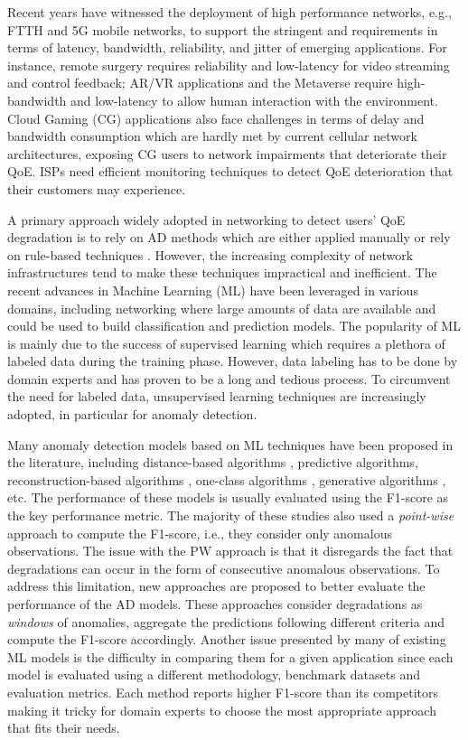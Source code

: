 Recent years have witnessed the deployment of high performance networks, e.g., FTTH and 5G mobile networks, to support the stringent and requirements in terms of latency, bandwidth, reliability, and jitter of emerging applications. For instance, remote surgery requires reliability and low-latency for video streaming and control feedback; AR/VR applications and the Metaverse require high-bandwidth and low-latency to allow human interaction with the environment. Cloud Gaming (CG) applications also face challenges in terms of delay and bandwidth consumption which are hardly met by current cellular network architectures, exposing CG users to network impairments that deteriorate their \ac{QoE}. \ac{ISP}s need efficient monitoring techniques to detect QoE deterioration that their customers may experience.

A primary approach widely adopted in networking to detect users' QoE degradation is to rely on \ac{AD} methods which are either applied manually or rely on rule-based techniques \cite{cannady1998artificial}. 
However, the increasing complexity of network infrastructures tend to make these techniques impractical and inefficient. The recent advances in Machine Learning (ML) have been leveraged in various domains, including networking where large amounts of data are available and could be used to build classification and prediction models. The popularity of ML is mainly due to the success of supervised learning which requires a plethora of labeled data during the training phase. However, data labeling has to be done by domain experts and has proven to be a long and tedious process. To circumvent the need for labeled data, unsupervised learning techniques are increasingly adopted, in particular for anomaly detection.

Many anomaly detection models based on ML techniques have been proposed in the literature, including distance-based algorithms \cite{liu2008isolation,Ramaswamy2000EfficientAF}, predictive algorithms, reconstruction-based algorithms \cite{zong2018deep, audibert2020usad}, one-class algorithms \cite{scholkopf1999support, pmlr-v80-ruff18a}, generative algorithms \cite{GoodfellowIan2020GenerativeAN}, etc. The performance of these models is usually evaluated using the F1-score as the key performance metric. The majority of these studies also used a \textit{point-wise} approach to compute the F1-score, i.e., they consider only anomalous observations. The issue with the \ac{PW} approach is that it disregards the fact that degradations can occur in the form of consecutive anomalous observations. To address this limitation, new approaches \cite{xu2018unsupervised,Lavin2015EvaluatingRA, hundman2018detecting} are proposed to better evaluate the performance of the AD models. These approaches consider degradations as \textit{windows} of anomalies, aggregate the predictions following different criteria and compute the F1-score accordingly. Another issue presented by many of existing ML models is the difficulty in comparing them for a given application since each model is evaluated using a different methodology, benchmark datasets and evaluation metrics. Each method reports higher F1-score than its competitors making it tricky for domain experts to choose the most appropriate approach that fits their needs.

